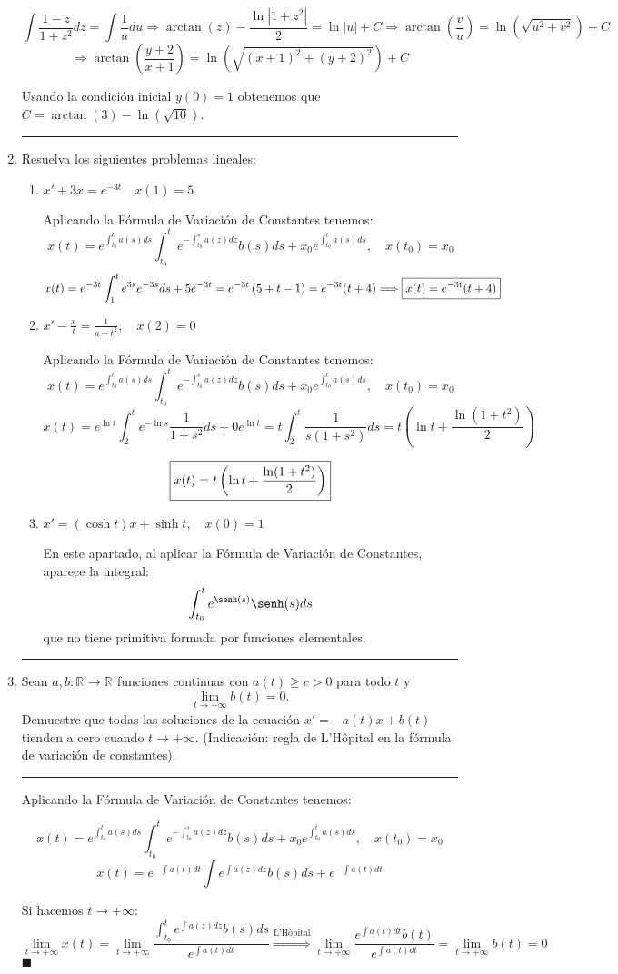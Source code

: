 \documentclass[12pt]{article}
\newcommand{\R}[1][]{\mathbb{R}^{#1}}
\newcommand{\solution}[1]{\text{\fbox{$#1$}}}
\newcommand{\FVCP}[5]{x(t)=e^{#1}\int_{#4}^{t}e^{#2}#3ds+#5e^{#1}}
\newcommand{\FVC}{x(t)=e^{\int_{t_0}^{t}a(s)ds}\int_{t_0}^te^{-\int_{t_0}^{s}a(z)dz}b(s)ds+x_0e^{\int_{t_0}^{t}a(s)ds}, \quad x(t_0)=x_0}
\newcommand{\qued}{\hfill$\blacksquare$}
\begin{document}
\begin{enumerate}
\[
\int \frac{1-z}{1+z^2}dz=\int \frac{1}{u}du \Longrightarrow \arctan(z)-\frac{\ln|1+z^2|}{2}=\ln|u|+C \Longrightarrow \arctan\left(\frac{v}{u}\right) = \ln(\sqrt{u^2+v^2})+C 
\]
\[
\Longrightarrow \arctan\left(\frac{y+2}{x+1}\right) = \ln(\sqrt{(x+1)^2+(y+2)^2})+C
\]

Usando la condición inicial $y(0)=1$ obtenemos que $C=\arctan(3)-\ln(\sqrt{10})$.

\hrule
\item Resuelva los siguientes problemas lineales:
\begin{enumerate}
\item $x'+3x=e^{-3t} \quad x(1)=5$

Aplicando la Fórmula de Variación de Constantes tenemos:
\[
\FVC
\]
\[
\FVCP{-3t}{3s}{e^{-3s}}{1}{5} = e^{-3t}\left( 5 + t - 1 \right) = e^{-3t}(t+4) \Longrightarrow \solution{x(t)= e^{-3t}(t+4)}
\]

\item $\displaystyle x'-\frac{x}{t}=\frac{1}{a+t^2}, \quad x(2)=0$

Aplicando la Fórmula de Variación de Constantes tenemos:
\[
\FVC
\]
\[
\FVCP{\ln t}{-\ln s}{\frac{1}{1+s^2}}{2}{0} = t\int_2^t\frac{1}{s(1+s^2)}ds=t\left( \ln t + \frac{\ln(1+t^2)}{2} \right)
\]

\[
\solution{x(t)=t\left( \ln t + \frac{\ln(1+t^2)}{2} \right)}
\]

\item $x'=(\cosh t)x+\sinh t, \quad x(0)=1$

En este apartado, al aplicar la Fórmula de Variación de Constantes, aparece la integral:
\[
\int_{t_0}^{t}e^{\senh(s)}\senh(s) ds
\]
que no tiene primitiva formada por funciones elementales.
\end{enumerate}

\hrule
\item Sean $a,b: \R \longrightarrow \R $ funciones continuas con $a(t)\geq c > 0$ para todo $t$ y
\[
\lim_{t \to +\infty}b(t)=0.
\]
Demuestre que todas las soluciones de la ecuación $x'=-a(t)x+b(t)$ tienden a cero cuando $t\longrightarrow +\infty$. (Indicación: regla de L'Hôpital en la fórmula de variación de constantes).
\hrule

Aplicando la Fórmula de Variación de Constantes tenemos:

\[
\FVC
\]
\[
x(t)=e^{-\int a(t)dt}\int e^{\int a(z)dz}b(s)ds+e^{-\int a(t)dt}
\]

Si hacemos $t\to +\infty$:
\[
\lim_{t\to +\infty}x(t)=\lim_{t\to +\infty}\frac{\int_{t_0}^t e^{\int a(z)dz}b(s)ds}{e^{\int a(t)dt}} \stackrel{\text{L'Hôpital}}{\Longrightarrow} \lim_{t\to +\infty} \frac{e^{\int a(t)dt}b(t)}{e^{\int a(t)dt}}=\lim_{t\to +\infty} b(t)=0
\]
\qued


\end{enumerate}
\end{document}
